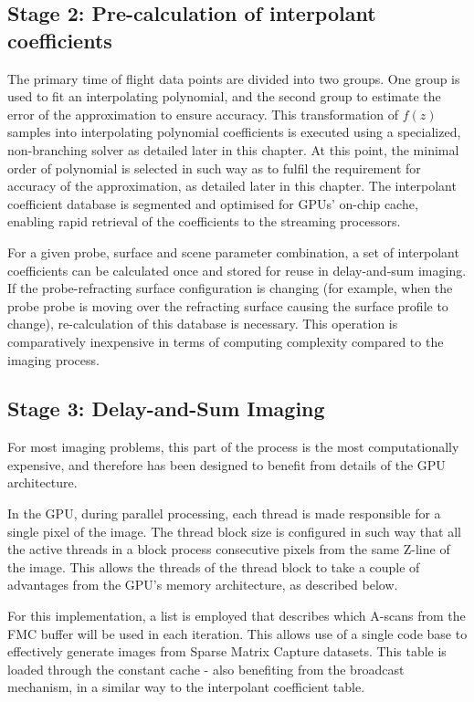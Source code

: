 \subsection{Stage 2: Pre-calculation of interpolant coefficients}
The primary time of flight data points are divided into two groups. One group is used to fit an interpolating polynomial, and the second group to estimate the error of the approximation to ensure accuracy. This transformation of $f(z)$ samples into interpolating polynomial coefficients is executed using a specialized, non-branching solver as detailed later in this chapter. At this point, the minimal order of polynomial is selected in such way as to fulfil the requirement for accuracy of the approximation, as detailed later in this chapter. The interpolant coefficient database is segmented and optimised for GPUs' on-chip cache, enabling rapid retrieval of the coefficients to the streaming processors.

For a given probe, surface and scene parameter combination, a set of interpolant coefficients can be calculated once and stored for reuse in delay-and-sum imaging. If the probe-refracting surface configuration is changing (for example, when the probe probe is moving over the refracting surface causing the surface profile to change), re-calculation of this database is necessary. This operation is comparatively inexpensive in terms of computing complexity compared to the imaging process. 

\subsection{Stage 3: Delay-and-Sum Imaging}

For most imaging problems, this part of the process is the most computationally expensive, and therefore has been designed to benefit from details of the GPU architecture.

In the GPU, during parallel processing, each thread is made responsible for a single pixel of the image. The thread block size is configured in such way that all the active threads in a block process consecutive pixels from the same Z-line of the image. This allows the threads of the thread block to take a couple of advantages from the GPU's memory architecture, as described below.

For this implementation, a list is employed that describes which A-scans from the FMC buffer will be used in each iteration. This allows use of a single code base to effectively generate images from Sparse Matrix Capture datasets. This table is loaded through the constant cache - also benefiting from the broadcast mechanism, in a similar way to the interpolant coefficient table.

